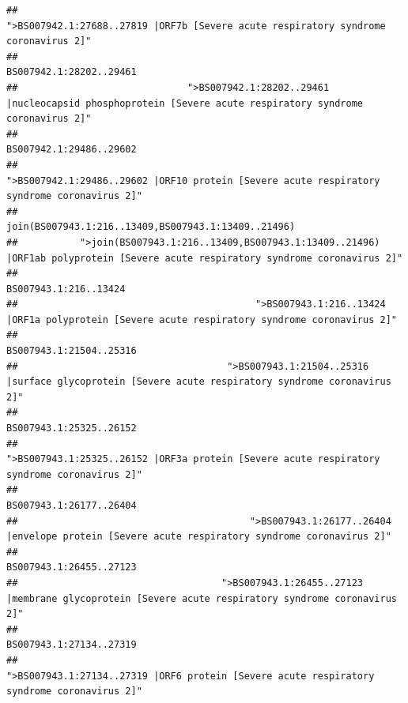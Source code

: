\documentclass[
]{article}
\begin{document}
\begin{verbatim}
##                                                    ">BS007942.1:27688..27819 |ORF7b [Severe acute respiratory syndrome coronavirus 2]" 
##                                                                                                                BS007942.1:28202..29461 
##                              ">BS007942.1:28202..29461 |nucleocapsid phosphoprotein [Severe acute respiratory syndrome coronavirus 2]" 
##                                                                                                                BS007942.1:29486..29602 
##                                            ">BS007942.1:29486..29602 |ORF10 protein [Severe acute respiratory syndrome coronavirus 2]" 
##                                                                                    join(BS007943.1:216..13409,BS007943.1:13409..21496) 
##           ">join(BS007943.1:216..13409,BS007943.1:13409..21496) |ORF1ab polyprotein [Severe acute respiratory syndrome coronavirus 2]" 
##                                                                                                                  BS007943.1:216..13424 
##                                          ">BS007943.1:216..13424 |ORF1a polyprotein [Severe acute respiratory syndrome coronavirus 2]" 
##                                                                                                                BS007943.1:21504..25316 
##                                     ">BS007943.1:21504..25316 |surface glycoprotein [Severe acute respiratory syndrome coronavirus 2]" 
##                                                                                                                BS007943.1:25325..26152 
##                                            ">BS007943.1:25325..26152 |ORF3a protein [Severe acute respiratory syndrome coronavirus 2]" 
##                                                                                                                BS007943.1:26177..26404 
##                                         ">BS007943.1:26177..26404 |envelope protein [Severe acute respiratory syndrome coronavirus 2]" 
##                                                                                                                BS007943.1:26455..27123 
##                                    ">BS007943.1:26455..27123 |membrane glycoprotein [Severe acute respiratory syndrome coronavirus 2]" 
##                                                                                                                BS007943.1:27134..27319 
##                                             ">BS007943.1:27134..27319 |ORF6 protein [Severe acute respiratory syndrome coronavirus 2]" 

\end{verbatim}
\end{document}
